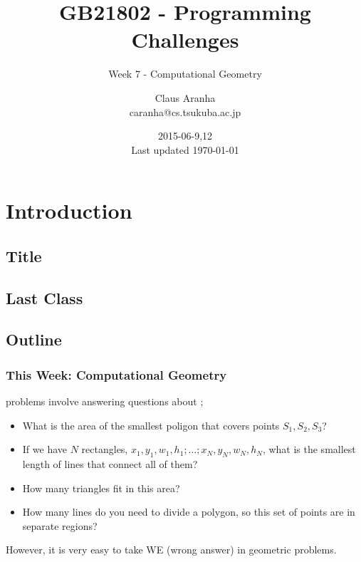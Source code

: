 \documentclass{beamer}
\title[GB21802]{GB21802 - Programming Challenges}
\subtitle[]{Week 7 - Computational Geometry}
\author[Claus Aranha]{Claus Aranha\\{\footnotesize caranha@cs.tsukuba.ac.jp}}
\institute{College of Information Science}
\date{2015-06-9,12\\{\tiny Last updated \today}}
\begin{document}
\section{Introduction}
\subsection{Title}
\begin{frame}
\maketitle
\end{frame}

\subsection{Last Class}



\subsection{Outline}
\begin{frame}
  \frametitle{This Week: Computational Geometry}

  {\small

     problems involve answering
    questions about ;

    \bigskip
    
    \begin{itemize}
    \item What is the area of the smallest poligon that covers points
      $S_1, S_2, S_3$?
    \item If we have $N$ rectangles, $x_1,y_1,w_1,h_1; \ldots; x_N,
      y_N, w_N, h_N$, what is the smallest length of lines that
      connect all of them?
    \item How many triangles fit in this area?
    \item How many lines do you need to divide a polygon, so this set
      of points are in separate regions?
    \end{itemize}

    \bigskip
    
    However, it is very easy to take \alert{WE (wrong answer)} in
    geometric problems.
  
  }
\end{frame}
\end{document}
